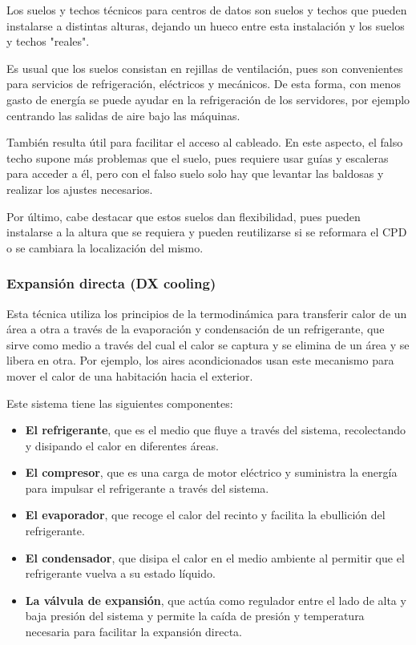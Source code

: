 Los suelos y techos técnicos para centros de datos son suelos y techos que pueden instalarse a distintas alturas, dejando un hueco entre esta instalación y los suelos y techos "reales".

Es usual que los suelos consistan en rejillas de ventilación, pues son convenientes para servicios de refrigeración, eléctricos y mecánicos. De esta forma, con menos gasto de energía se puede ayudar en la refrigeración de los servidores, por ejemplo centrando las salidas de aire bajo las máquinas.

También resulta útil para facilitar el acceso al cableado. En este aspecto, el falso techo supone más problemas que el suelo, pues requiere usar guías y escaleras para acceder a él, pero con el falso suelo solo hay que levantar las baldosas y realizar los ajustes necesarios.

Por último, cabe destacar que estos suelos dan flexibilidad, pues pueden instalarse a la altura que se requiera y pueden reutilizarse si se reformara el CPD o se cambiara la localización del mismo.

\subsubsection{Expansión directa (DX cooling)}

Esta técnica utiliza los principios de la termodinámica para transferir calor de un área a otra a través de la evaporación y condensación de un refrigerante, que sirve como medio a través del cual el calor se captura y se elimina de un área y se libera en otra. Por ejemplo, los aires acondicionados usan este mecanismo para mover el calor de una habitación hacia el exterior.

Este sistema tiene las siguientes componentes:

\begin{itemize}
    \item {\textbf{El refrigerante}}, que es el medio que fluye a través del sistema, recolectando y disipando el calor en diferentes áreas.
    \item \textbf{El compresor}, que es una carga de motor eléctrico y suministra la energía para impulsar el refrigerante a través del sistema.
    \item \textbf{El evaporador}, que recoge el calor del recinto y facilita la ebullición del refrigerante.
    \item \textbf{El condensador}, que disipa el calor en el medio ambiente al permitir que el refrigerante vuelva a su estado líquido.
    \item \textbf{La válvula de expansión}, que actúa como regulador entre el lado de alta y baja presión del sistema y permite la caída de presión y temperatura necesaria para facilitar la expansión directa.
\end{itemize}

